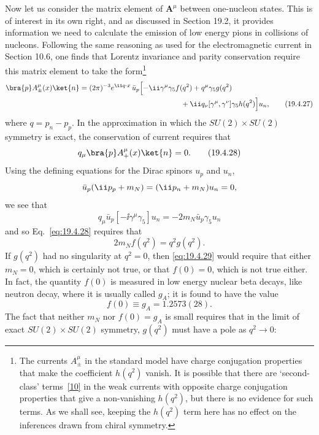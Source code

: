 Now let us consider the matrix element of $\mathbf{A}^\mu$ between one-nucleon states. This is of interest in its own right, and as discussed in Section 19.2, it provides information we need to calculate the emission of low energy pions in collisions of nucleons. Following the same reasoning as used for the electromagnetic current in Section 10.6, one finds that Lorentz invariance and parity conservation require this matrix element to take the form\footnote{The currents $A_\pm^\mu$ in the standard model have charge conjugation properties that make the coefficient $h(q^2)$ vanish. It is possible that there are `second-class' terms~\hyperref[ch19-ref-10]{[10]} in the weak currents with opposite charge conjugation properties that give a non-vanishing $h(q^2)$, but there is no evidence for such terms. As we shall see, keeping the $h(q^2)$ term here has no effect on the inferences drawn from chiral symmetry.}
\begin{align}
\bra{p}A_\pm^\mu(x)\ket{n}
={}&(2\pi)^{-3}e^{\ii q\cdot x}\,
\bar u_p\Bigl[
-\ii\gamma^\mu\gamma_5 f(q^2)
+q^\mu\gamma_5 g(q^2)
\notag\\
&\hspace{44mm}
+\ii q_\nu[\gamma^\mu,\gamma^\nu]\gamma_5h(q^2)
\Bigr]u_n,
\tag{19.4.27}\label{eq:19.4.27}
\end{align}
where $q=p_n-p_p$. In the approximation in which the $SU(2)\times SU(2)$ symmetry is exact, the conservation of current requires that
\begin{equation}
q_\mu\bra{p}A_+^\mu(x)\ket{n}=0.
\tag{19.4.28}\label{eq:19.4.28}
\end{equation}
Using the defining equations for the Dirac spinors $u_p$ and $u_n$,
\[
\bar u_p(\ii\sl{p}_p+m_N)=(\ii\sl{p}_n+m_N)u_n=0,
\]
we see that
\[
q_\mu\bar u_p[-\ii\gamma^\mu\gamma_5]u_n
=-2m_N\bar u_p\gamma_5u_n
\]
and so Eq.~\eqref{eq:19.4.28} requires that
\begin{equation}
2m_Nf(q^2)=q^2g(q^2).
\tag{19.4.29}\label{eq:19.4.29}
\end{equation}
If $g(q^2)$ had no singularity at $q^2=0$, then \eqref{eq:19.4.29} would require that either $m_N=0$, which is certainly not true, or that $f(0)=0$, which is not true either. In fact, the quantity $f(0)$ is measured in low energy nuclear beta decays, like neutron decay, where it is usually called $g_A$; it is found to have the value
\begin{equation}
f(0)\equiv g_A=1.2573(28).
\tag{19.4.30}\label{eq:19.4.30}
\end{equation}
The fact that neither $m_N$ nor $f(0)=g_A$ is small requires that in the limit of exact $SU(2)\times SU(2)$ symmetry, $g(q^2)$ must have a pole as $q^2\to0$:

